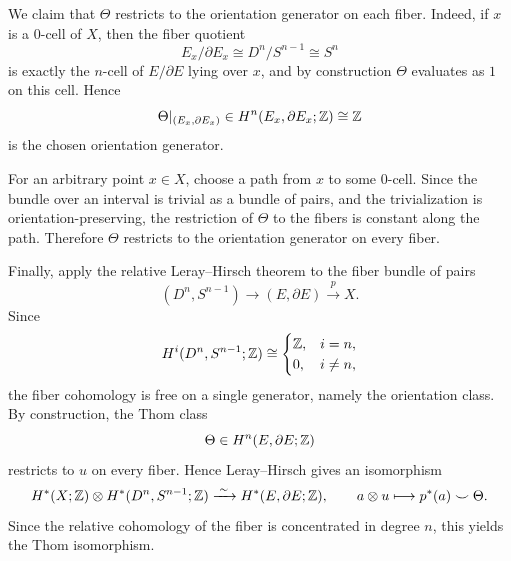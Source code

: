 \documentclass[12pt]{article}  %
\begin{document}
\begin{solution}
\begin{enumerate}
We claim that $\Theta$ restricts to the orientation generator on each fiber.
Indeed, if $x$ is a $0$-cell of $X$, then the fiber quotient
\[
E_x/\partial E_x \cong D^n/S^{n-1}\cong S^n
\]
is exactly the $n$-cell of $E/\partial E$ lying over $x$, and by construction
$\Theta$ evaluates as $1$ on this cell. Hence
\[
\Theta|_{(E_x,\partial E_x)}
\in H^n(E_x,\partial E_x;\mathbb{Z})\cong \mathbb{Z}
\]
is the chosen orientation generator.

For an arbitrary point $x\in X$, choose a path from $x$ to some $0$-cell.
Since the bundle over an interval is trivial as a bundle of pairs, and the
trivialization is orientation-preserving, the restriction of $\Theta$ to the
fibers is constant along the path. Therefore $\Theta$ restricts to the
orientation generator on every fiber.
    \end{enumerate}

    Finally, apply the relative Leray--Hirsch theorem to the fiber bundle of pairs
\[
(D^n,S^{n-1}) \longrightarrow (E,\partial E)\xrightarrow{\,p\,} X.
\]
Since
\[
H^i(D^n,S^{n-1};\mathbb{Z})\cong
\begin{cases}
\mathbb{Z},& i=n,\\
0,& i\neq n,
\end{cases}
\]
the fiber cohomology is free on a single generator, namely the orientation class. By construction, the Thom class
\[
\Theta\in H^n(E,\partial E;\mathbb{Z})
\]
restricts to \(u\) on every fiber. Hence Leray--Hirsch gives an isomorphism
\[
H^*(X;\mathbb{Z})\otimes H^*(D^n,S^{n-1};\mathbb{Z})\xrightarrow{\;\sim\;} H^*(E,\partial E;\mathbb{Z}),
\qquad
a\otimes u\longmapsto p^*(a)\smile\Theta.
\]
Since the relative cohomology of the fiber is concentrated in degree \(n\), this yields the Thom isomorphism.
\end{solution}
\end{document}
